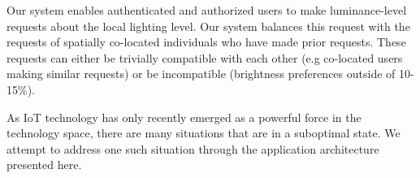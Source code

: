 \documentclass[10pt,twocolumn,letterpaper]{article}
\begin{document}
Our system enables authenticated and authorized users to make luminance-level
requests about the local lighting level. Our system balances this request with
the requests of spatially co-located individuals who have made prior requests.
These requests can either be trivially compatible with each other (e.g
co-located users making similar requests) or be incompatible (brightness
preferences outside of 10-15\%).

As IoT technology has only recently emerged as a powerful force in the
technology space, there are many situations that are in a suboptimal state. We
attempt to address one such situation through the application architecture
presented here.
\end{document}
